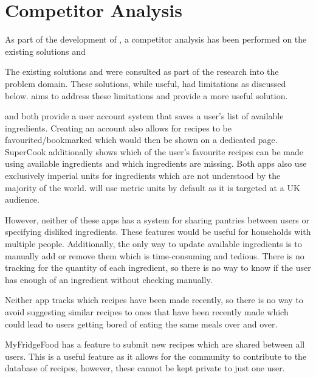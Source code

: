 \section{Competitor Analysis}
As part of the development of \chef{}, a competitor analysis has been performed on the existing solutions \cite{myfridgefood_myfridgefood_nodate} and \cite{supercook_supercook_nodate}

The existing solutions \cite{myfridgefood_myfridgefood_nodate} and \cite{supercook_supercook_nodate} were consulted
as part of the research into the problem domain. These solutions, while useful, had limitations as discussed below.
\chef{} aims to address these limitations and provide a more useful solution.

\cite{myfridgefood_myfridgefood_nodate} and \cite{supercook_supercook_nodate} both provide a user account system
that saves a user's list of available ingredients. Creating an account also allows for recipes to be favourited/bookmarked
which would then be shown on a dedicated page. SuperCook additionally shows which of the user's favourite recipes
can be made using available ingredients and which ingredients are missing. Both apps also use exclusively imperial
units for ingredients which are not understood by the majority of the world. \chef{} will use metric units by default
as it is targeted at a UK audience.

However, neither of these apps has a system for sharing pantries between users or specifying disliked ingredients. These features would be useful for households with multiple people.
Additionally, the only way to update available ingredients is to manually add or remove them which is time-consuming and tedious. There is no tracking for the quantity of
each ingredient, so there is no way to know if the user has enough of an ingredient without checking manually.

Neither app tracks which recipes have been made recently, so there is no way to avoid suggesting similar recipes to ones that have been recently made which could lead to
users getting bored of eating the same meals over and over.

MyFridgeFood has a feature to submit new recipes which are shared between all users. This is a useful feature as it allows for the community to contribute to the database
of recipes, however, these cannot be kept private to just one user.

